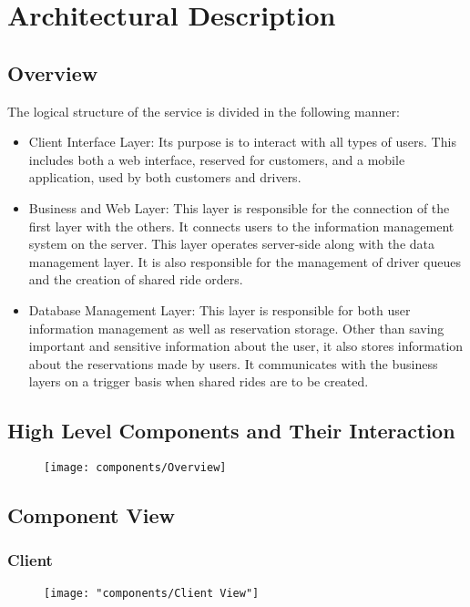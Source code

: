 \section{Architectural Description}

\subsection{Overview}
	The logical structure of the service is divided in the following manner:
	\begin{itemize}
		\item{Client Interface Layer:} Its purpose is to interact with all types of users. This includes both a web interface, reserved for customers, and a mobile application,
			used by both customers and drivers.
		\item{Business and Web Layer:} This layer is responsible for the connection of the first layer with the others. It connects users to the information management
			system on the server. This layer operates server-side along with the data management layer. It is also responsible for the management of driver queues and
			the creation of shared ride orders.
		\item{Database Management Layer:} This layer is responsible for both user information management as well as reservation storage. Other than saving important and sensitive
			information about the user, it also stores information about the reservations made by users. It communicates with the business layers on a trigger basis when shared rides
			are to be created.
	\end{itemize}
\subsection{High Level Components and Their Interaction}

	\begin{figure}[h!]
		\centering
		\texttt{[image: components/Overview]}
	\end{figure}

\subsection{Component View}
	\subsubsection{Client}
		\begin{figure}[h!]
			\centering
			\texttt{[image: "components/Client View"]}
		\end{figure}
